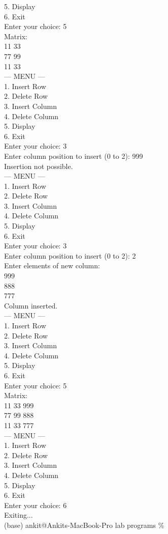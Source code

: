 \documentclass[12pt,a4paper]{article}
\begin{document}
\begin{tcolorbox}[creambox]
5. Display\\
6. Exit\\
Enter your choice: 5\\
Matrix:\\
11 33\\
77 99\\
11 33\\
--- MENU ---\\
1. Insert Row\\
2. Delete Row\\
3. Insert Column\\
4. Delete Column\\
5. Display\\
6. Exit\\
Enter your choice: 3\\
Enter column position to insert (0 to 2): 999\\
Insertion not possible.\\
--- MENU ---\\
1. Insert Row\\
2. Delete Row\\
3. Insert Column\\
4. Delete Column\\
5. Display\\
6. Exit\\
Enter your choice: 3\\
Enter column position to insert (0 to 2): 2\\
Enter elements of new column:\\
999\\
888\\
777\\
Column inserted.\\
--- MENU ---\\
1. Insert Row\\
2. Delete Row\\
3. Insert Column\\
4. Delete Column\\
5. Display\\
6. Exit\\
Enter your choice: 5\\
Matrix:\\
11 33 999\\
77 99 888\\
11 33 777\\
--- MENU ---\\
1. Insert Row\\
2. Delete Row\\
3. Insert Column\\
4. Delete Column\\
5. Display\\
6. Exit\\
Enter your choice: 6\\
Exiting...\\
(base) ankit@Ankits-MacBook-Pro lab programs \%
\end{tcolorbox}
\end{document}
